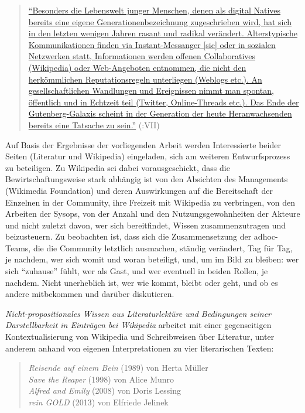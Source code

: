 \documentclass[fontsize=12pt]{scrartcl}
\begin{document}
\singlespacing
\begin{quote}
\href{http://www.degruyter.com/view/books/9783486858662/9783486858662-001/9783486858662-001.xml}{"`Besonders die Lebenswelt junger Menschen, denen als \flq digital Natives\frq \\bereits eine eigene Generationenbe\-zeichnung zugeschrieben wird, hat sich in den letzten wenigen Jahren rasant und radikal ver\"andert. Altersty\-pische Kommunikationen finden via Instant-Messanger [sic] oder in so\-zi\-a\-len Netzwerken statt, Informationen werden offenen Collaboratives (Wi\-ki\-pe\-dia) oder Web-Angeboten entnommen, die nicht den herk\"omm\-li\-chen Reputationsregeln unterliegen (Weblogs etc.). An ge\-sell\-schaft\-li\-chen Wand\-lun\-gen und Ereignissen nimmt man spontan, \"of\-fent\-lich und in Echtzeit teil (Twitter, Online-Threads etc.). Das Ende der Gutenberg-Galaxis scheint in der Generation der heute Heranwachsenden bereits eine Tatsache zu sein."'} (\cite{DemantowskyPallaske2015}:VII)
\end{quote}
\onehalfspacing

Auf Basis der Ergebnisse der vorliegenden Arbeit werden Interessierte beider Seiten (Li\-te\-ra\-tur und Wi\-ki\-pe\-dia) eingeladen, sich am weiteren Entwurfsprozess zu beteiligen. Zu Wi\-ki\-pe\-dia sei dabei vorausgeschickt, dass die Bewirtschaftungsweise stark abh\"angig ist von den Absichten des Managements (Wikimedia Foundation) und deren Auswirkungen auf die Bereitschaft der Einzelnen in der Community, ihre Freizeit mit Wi\-ki\-pe\-dia zu verbringen, von den Arbeiten der Sysops\textsuperscript{\tiny *}, von der Anzahl und den Nutzungsgewohnheiten der Akteure\textsuperscript{\tiny *} und nicht zu\-letzt davon, wer sich bereitfindet, Wissen zusammenzutragen und beizusteuern. Zu beobachten ist, dass sich die Zusammensetzung der adhoc-Teams, die die Community letzt\-lich ausmachen, st\"andig ver\"andert, Tag f\"ur Tag, je nachdem, wer sich womit und woran beteiligt, und, um im Bild zu bleiben: wer sich "`zuhause"' f\"uhlt, wer als Gast, und wer eventuell in beiden Rollen, je nachdem. Nicht unerheblich ist, wer wie kommt, bleibt oder geht, und ob es andere mitbekommen und dar\"uber diskutieren.

\textit{Nicht-pro\-po\-si\-ti\-o\-na\-les Wissen aus Li\-te\-ra\-tur\-lekt\"ure und Bedingungen seiner Darstellbarkeit in Eintr\"agen bei Wi\-ki\-pe\-dia} arbeitet mit einer gegenseitigen Kontextualisierung von Wi\-ki\-pe\-dia und Schreibweisen \"uber Li\-te\-ra\-tur, unter anderem anhand von eigenen Interpretationen zu \mbox{vier} li\-te\-ra\-rischen Texten:
\begin{quote} 
\textit{Reisende auf einem Bein} (1989) von Herta M\"uller\\
\textit{Save the Reaper} (1998) von Alice Munro\\
\textit{Alfred and Emily} (2008) von Doris Lessing\\
\textit{rein GOLD} (2013) von Elfriede Jelinek
\end{quote}
\end{document}
